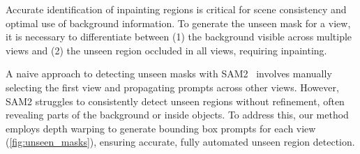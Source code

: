 Accurate identification of inpainting regions is critical for scene consistency and optimal use of background information. To generate the unseen mask for a view, it is necessary to differentiate between (1) the background visible across multiple views and (2) the unseen region occluded in all views, requiring inpainting.




A naive approach to detecting unseen masks with SAM2~\cite{ravi2024sam2} involves manually selecting the first view and propagating prompts across other views. However, SAM2 struggles to consistently detect unseen regions without refinement, often revealing parts of the background or inside objects. To address this, our method employs depth warping to generate bounding box prompts for each view (\cref{fig:unseen_masks}), ensuring accurate, fully automated unseen region detection.



